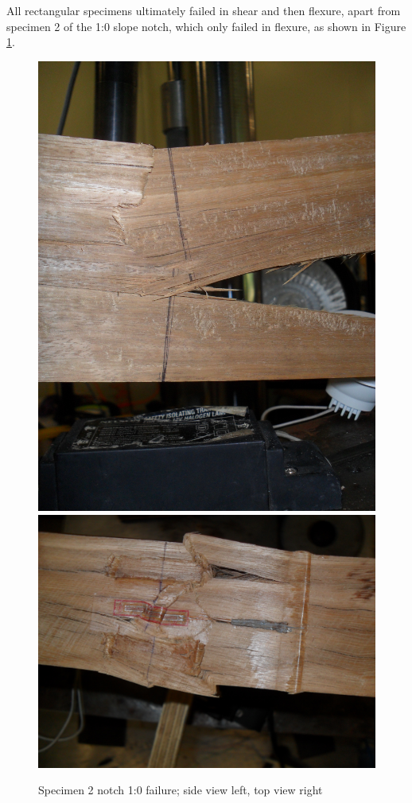 \documentclass[11pt,a4paper]{article}
\numberwithin{equation}{subsection}
\begin{document}
\noindent
All rectangular specimens ultimately failed in shear and then flexure, apart from specimen 2 of the 1:0 slope notch, which only failed in flexure, as shown in Figure \ref{fig:Spec_2}.

\begin{figure}[h]
	\begin{center}
		\includegraphics[scale=0.05]{Spec_2_flex}
		\includegraphics[scale=0.086]{Spec_2_Top}
	\end{center}
	\caption{Specimen 2 notch 1:0 failure; side view left, top view right}
	\label{fig:Spec_2}
\end{figure}
\end{document}
